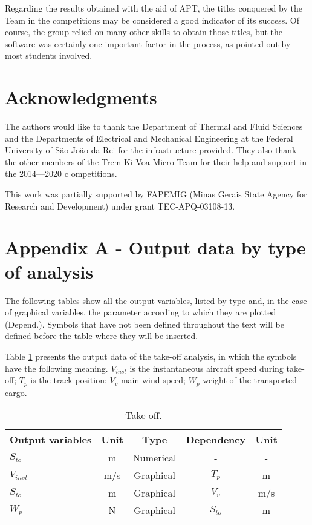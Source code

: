\documentclass[10pt]{SelfArx} %
\begin{document}
Regarding the results obtained with the aid of  APT, the  titles  conquered by the Team in the  competitions may be considered a good indicator of its success. Of course, the group relied on many other skills to obtain those titles, but the software was certainly one important factor in the process, as pointed out by most students involved. 


\section*{Acknowledgments} 


The authors would like to thank the Department of Thermal and Fluid Sciences and the Departments of Electrical and Mechanical Engineering at the Federal University of São João da Rei for the infrastructure provided. They also thank the other members of the Trem Ki Voa Micro Team for their help and support in the 2014---2020 c ompetitions.

This work was partially supported by FAPEMIG (Minas Gerais State  Agency for Research and Development)  under grant TEC-APQ-03108-13. 

\section*{Appendix A - Output data by type of analysis}

The following tables show all the output variables, listed by type and, in the case of graphical variables, the parameter according to which they are plotted (Depend.). Symbols that have not been defined throughout the text will be defined before the table where they will be inserted.

Table \ref{Tab:output_decolagem} presents the output data of the take-off analysis, in which the symbols have the following meaning. 
$V_ {inst}$ is the instantaneous aircraft speed during take-off; $T_ {p}$ is the track position; $V_v$ main wind speed; $W_p$ weight of the transported cargo.

\begin{table}[htb]
\small\sf\centering
\caption{Take-off.\label{Tab:output_decolagem}}
\begin{tabular}{lcccc}
\toprule
Output variables		&Unit		&Type			&Dependency 	&Unit		\\
\midrule
{$S_{to}$} 			&m 		&Numerical		&- 			&-		\\
{$V_{inst}$} 		&m/s		&Graphical		&$T_{p}$ 		&m		\\
{$S_{to}$} 			&m		&Graphical		&$V_v$ 		&m/s		\\
{$W_{p}$} 			&N 		&Graphical		&$S_{to}$ 		&m		\\
\bottomrule
\end{tabular}\\[10pt]
\end{table}
\end{document}
